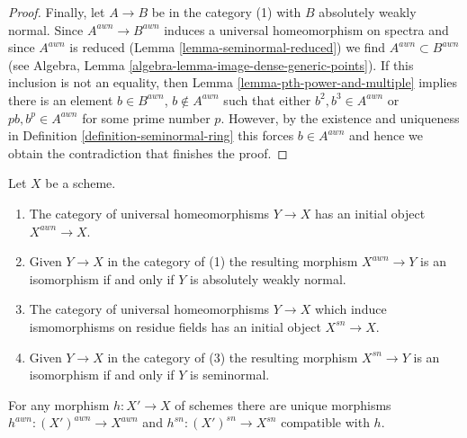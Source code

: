\begin{proof}
\medskip\noindent
Finally, let $A \to B$ be in the category (1) with $B$ absolutely weakly normal.
Since $A^{awn} \to B^{awn}$ induces a universal homeomorphism on spectra and 
since $A^{awn}$ is reduced (Lemma \ref{lemma-seminormal-reduced}) we find
$A^{awn} \subset B^{awn}$
(see Algebra, Lemma \ref{algebra-lemma-image-dense-generic-points}).
If this inclusion is not an equality, then
Lemma \ref{lemma-pth-power-and-multiple}
implies there is an element $b \in B^{awn}$, $b \not \in A^{awn}$
such that either $b^2, b^3 \in A^{awn}$ or $pb, b^p \in A^{awn}$
for some prime number $p$. However, by the existence and uniqueness in
Definition \ref{definition-seminormal-ring} this forces $b \in A^{awn}$
and hence we obtain the contradiction that finishes the proof.
\end{proof}

\begin{lemma}
\label{lemma-seminormalization}
Let $X$ be a scheme.
\begin{enumerate}
\item The category of universal homeomorphisms $Y \to X$ has
an initial object $X^{awn} \to X$.
\item Given $Y \to X$ in the category of (1) the resulting morphism
$X^{awn} \to Y$ is an isomorphism if and only if $Y$ is
absolutely weakly normal.
\item The category of universal homeomorphisms $Y \to X$ which
induce ismomorphisms on residue fields has an initial object
$X^{sn} \to X$.
\item Given $Y \to X$ in the category of (3) the resulting morphism
$X^{sn} \to Y$ is an isomorphism if and only if $Y$ is seminormal.
\end{enumerate}
For any morphism $h : X' \to X$ of schemes there are unique morphisms
$h^{awn} : (X')^{awn} \to X^{awn}$ and $h^{sn} : (X')^{sn} \to X^{sn}$
compatible with $h$.
\end{lemma}

